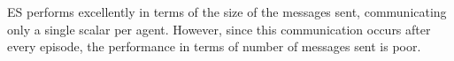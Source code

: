 ES performs excellently in terms of the size of the messages sent, communicating only a single scalar per agent. However, since this communication occurs after every episode, the performance in terms of number of messages sent is poor.



